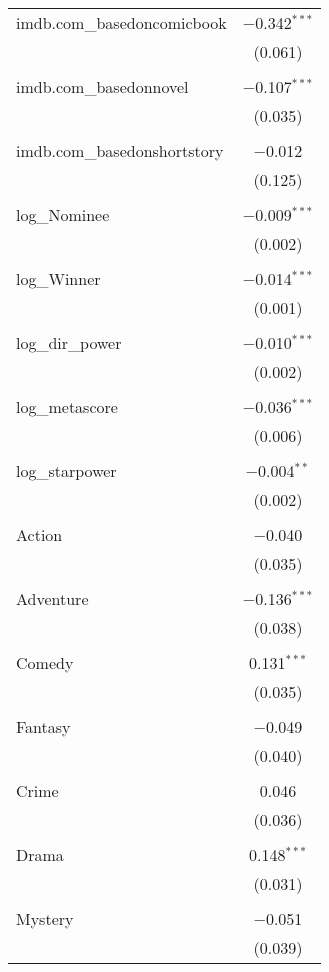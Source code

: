 \begin{table}[!htbp]
\begin{tabular}{@{\extracolsep{5pt}}lc}
 imdb.com\_basedoncomicbook & $-$0.342$^{***}$ \\ 
  & (0.061) \\ 
  & \\ 
 imdb.com\_basedonnovel & $-$0.107$^{***}$ \\ 
  & (0.035) \\ 
  & \\ 
 imdb.com\_basedonshortstory & $-$0.012 \\ 
  & (0.125) \\ 
  & \\ 
 log\_Nominee & $-$0.009$^{***}$ \\ 
  & (0.002) \\ 
  & \\ 
 log\_Winner & $-$0.014$^{***}$ \\ 
  & (0.001) \\ 
  & \\ 
 log\_dir\_power & $-$0.010$^{***}$ \\ 
  & (0.002) \\ 
  & \\ 
 log\_metascore & $-$0.036$^{***}$ \\ 
  & (0.006) \\ 
  & \\ 
 log\_starpower & $-$0.004$^{**}$ \\ 
  & (0.002) \\ 
  & \\ 
 Action & $-$0.040 \\ 
  & (0.035) \\ 
  & \\ 
 Adventure & $-$0.136$^{***}$ \\ 
  & (0.038) \\ 
  & \\ 
 Comedy & 0.131$^{***}$ \\ 
  & (0.035) \\ 
  & \\ 
 Fantasy & $-$0.049 \\ 
  & (0.040) \\ 
  & \\ 
 Crime & 0.046 \\ 
  & (0.036) \\ 
  & \\ 
 Drama & 0.148$^{***}$ \\ 
  & (0.031) \\ 
  & \\ 
 Mystery & $-$0.051 \\ 
  & (0.039) \\ 

\end{tabular}
\end{table}
